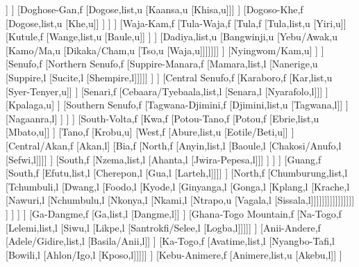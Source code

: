 \documentclass[landscape]{standalone}
\begin{document}
\begin{forest}
								[Dyan,u]]
							]
							[Doghose-Gan,f
								[Dogose,list,u
								[Kaansa,u
								[Khisa,u]]]
							]
							[Dogoso-Khe,f
								[Dogose,list,u
								[Khe,u]]
							]
						]
					]
					[Waja-Kam,f
						[Tula-Waja,f
							[Tula,f
								[Tula,list,u
								[Yiri,u]]
								[Kutule,f
									[Wange,list,u
									[Baule,u]]
								]
							]
							[Dadiya,list,u
							[Bangwinji,u
							[Yebu/Awak,u
							[Kamo/Ma,u
							[Dikaka/Cham,u
							[Tso,u
							[Waja,u]]]]]]]
						]
						[Nyingwom/Kam,u]
					]
				]
				[Senufo,f
					[Northern Senufo,f
						[Suppire-Manara,f
							[Mamara,list,l
							[Nanerige,u
							[Suppire,l
							[Sucite,l
							[Shempire,l]]]]]
						]
					]
					[Central Senufo,f
						[Karaboro,f
							[Kar,list,u
							[Syer-Tenyer,u]]
						]
						[Senari,f
							[Cebaara/Tyebaala,list,l
							[Senara,l
							[Nyarafolo,l]]]
						]
						[Kpalaga,u]
					]
					[Southern Senufo,f
						[Tagwana-Djimini,f
							[Djimini,list,u
							[Tagwana,l]]
						]
						[Nagaanra,l]
					]
				]
			]
			[South-Volta,f
				[Kwa,f
					[Potou-Tano,f
						[Potou,f
							[Ebrie,list,u
							[Mbato,u]]
						]
						[Tano,f
							[Krobu,u]
							[West,f
								[Abure,list,u
								[Eotile/Beti,u]]
							]
							[Central/Akan,f
								[Akan,l]
								[Bia,f
									[North,f
										[Anyin,list,l
										[Baoule,l
										[Chakosi/Anufo,l
										[Sefwi,l]]]]
									]
									[South,f
										[Nzema,list,l
										[Ahanta,l
										[Jwira-Pepesa,l]]]
									]
								]
							]
							[Guang,f
								[South,f
									[Efutu,list,l
									[Cherepon,l
									[Gua,l
									[Larteh,l]]]]
								]
								[North,f
									[Chumburung,list,l
									[Tchumbuli,l
									[Dwang,l
									[Foodo,l
									[Kyode,l
									[Ginyanga,l
									[Gonga,l
									[Kplang,l
									[Krache,l
									[Nawuri,l
									[Nchumbulu,l
									[Nkonya,l
									[Nkami,l
									[Ntrapo,u
									[Vagala,l
									[Sissala,l]]]]]]]]]]]]]]]]
								]
							]
						]
					]
					[Ga-Dangme,f
						[Ga,list,l
						[Dangme,l]]
					]
					[Ghana-Togo Mountain,f
						[Na-Togo,f
							[Lelemi,list,l
							[Siwu,l
							[Likpe,l
							[Santrokfi/Selee,l
							[Logba,l]]]]]
						]
						[Anii-Andere,f
							[Adele/Gidire,list,l
							[Basila/Anii,l]]
						]
						[Ka-Togo,f
							[Avatime,list,l
							[Nyangbo-Tafi,l
							[Bowili,l
							[Ahlon/Igo,l
							[Kposo,l]]]]]
						]		
						[Kebu-Animere,f
							[Animere,list,u
							[Akebu,l]]
						]

\end{forest}
\end{document}
